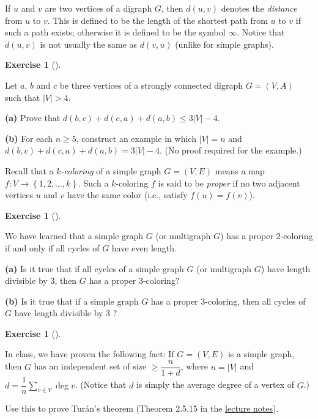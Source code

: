 \documentclass[numbers=enddot,12pt,final,onecolumn,notitlepage]{scrartcl}%
\newcounter{exer}
\theoremstyle{definition}
\newtheorem{exmp}[exer]{Exercise}
\newenvironment{exercise}[1][]
{\begin{exmp}[#1]\begin{leftbar}}
{\end{leftbar}\end{exmp}}
\let\sumnonlimits\sum
\renewcommand{\sum}{\sumnonlimits\limits}
\newcommand{\set}[1]{\left\{ #1 \right\}}
\newcommand{\abs}[1]{\left| #1 \right|}
\newcommand{\tup}[1]{\left( #1 \right)}
\begin{document}
If $u$ and $v$ are two vertices of a digraph $G$, then
$d \tup{u, v}$ denotes the \textit{distance} from $u$ to $v$. This
is defined to be the length of the shortest path from $u$ to $v$ if
such a path exists; otherwise it is defined to be the symbol $\infty$.
Notice that $d \tup{u, v}$ is not usually the same as $d \tup{v, u}$
(unlike for simple graphs).

\begin{exercise} \label{exe.hw3.d+d+d.directed}
Let $a$, $b$ and $c$ be three vertices of a strongly connected
digraph $G = \tup{V, A}$ such that $\abs{V} > 4$.

\textbf{(a)} Prove that
$d \tup{b, c} + d \tup{c, a} + d \tup{a, b} \leq 3 \abs{V} - 4$.

\textbf{(b)} For each $n \geq 5$, construct an example in which
$\abs{V} = n$ and
$d \tup{b, c} + d \tup{c, a} + d \tup{a, b} = 3 \abs{V} - 4$.
(No proof required for the example.)
\end{exercise}

Recall that a \textit{$k$-coloring} of a simple graph $G = \tup{V, E}$
means a map $f : V \to \set{1, 2, \ldots, k}$. Such a $k$-coloring $f$
is said to be \textit{proper} if no two adjacent vertices $u$ and $v$
have the same color (i.e., satisfy $f \tup{u} = f \tup{v}$).

\begin{exercise} \label{exe.hw3.not-tripar}
We have learned that a simple graph $G$ (or multigraph $G$)
has a proper $2$-coloring if
and only if all cycles of $G$ have even length.

\textbf{(a)} Is it true that if all cycles of a simple graph $G$ (or
multigraph $G$) have length divisible by $3$, then $G$ has a proper
$3$-coloring?

\textbf{(b)} Is it true that if a simple graph $G$ has a proper
$3$-coloring, then all cycles of $G$ have length divisible by $3$ ?
\end{exercise}

\begin{exercise} \label{exe.hw3.turan}
In class, we have proven the following fact: If $G = \tup{V, E}$ is a
simple graph, then $G$ has an independent set of size
$\geq \dfrac{n}{1+d}$, where $n = \abs{V}$ and
$d = \dfrac{1}{n} \sum_{v \in V} \deg v$. (Notice that $d$ is simply
the average degree of a vertex of $G$.)

Use this to prove Tur\'an's theorem (Theorem 2.5.15 in the
\href{http://www-users.math.umn.edu/~dgrinber/5707s17/nogra.pdf}{lecture notes}).
\end{exercise}
\end{document}
